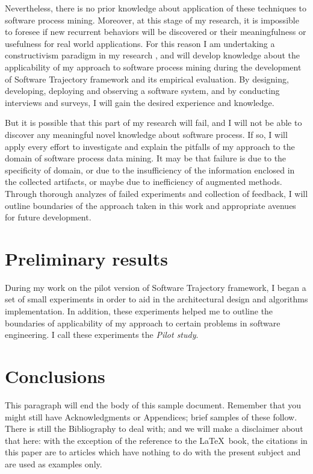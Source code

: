 \documentclass{sig-alternate}
\begin{document}
Nevertheless, there is no prior knowledge about application of these techniques to software process mining. Moreover, at this stage of my research, it is impossible to foresee if new recurrent behaviors will be discovered or their meaningfulness or usefulness for real world applications. For this reason I am undertaking a constructivism paradigm in my research \cite{citeulike:209817}, and will develop knowledge about the applicability of my approach to software process mining during the development of Software Trajectory framework and its empirical evaluation. By designing, developing, deploying and observing a software system, and by conducting interviews and surveys, I will gain the desired experience and knowledge.

But it is possible that this part of my research will fail, and I will not be able to discover any meaningful novel knowledge about software process. If so, I will apply every effort to investigate and explain the pitfalls of my approach to the domain of software process data mining. It may be that failure is due to the specificity of domain, or due to the insufficiency of the information enclosed in the collected artifacts, or maybe due to inefficiency of augmented methods. Through thorough analyzes of failed experiments and collection of feedback, I will outline boundaries of the approach taken in this work and appropriate avenues for future development.


\section{Preliminary results}
During my work on the pilot version of Software Trajectory framework, I began a set of small experiments in order to aid in the architectural design and algorithms implementation. In addition, these experiments helped me to outline the boundaries of applicability of my approach to certain problems in software engineering. I call these experiments the \textit{Pilot study}.



\section{Conclusions}
This paragraph will end the body of this sample document.
Remember that you might still have Acknowledgments or
Appendices; brief samples of these
follow.  There is still the Bibliography to deal with; and
we will make a disclaimer about that here: with the exception
of the reference to the \LaTeX\ book, the citations in
this paper are to articles which have nothing to
do with the present subject and are used as
examples only.
\end{document}
